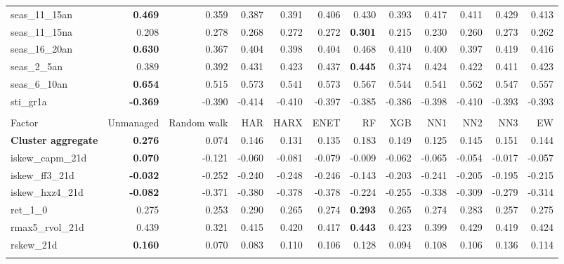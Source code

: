 \begin{landscape}
\begin{longtable}{>{\raggedright\arraybackslash}p{2.6cm}rrrrrrrrrrr}
seas\_11\_15an & \textbf{0.469} & 0.359 & 0.387 & 0.391 & 0.406 & 0.430 & 0.393 & 0.417 & 0.411 & 0.429 & 0.413 \\
seas\_11\_15na & 0.208 & 0.278 & 0.268 & 0.272 & 0.272 & \textbf{\cellcolor{blue!10}0.301} & 0.215 & 0.230 & 0.260 & 0.273 & 0.262 \\
seas\_16\_20an & \textbf{0.630} & 0.367 & 0.404 & 0.398 & 0.404 & 0.468 & 0.410 & 0.400 & 0.397 & 0.419 & 0.416 \\
seas\_2\_5an & 0.389 & 0.392 & \cellcolor{blue!10}0.431 & \cellcolor{blue!10}0.423 & \cellcolor{blue!10}0.437 & \textbf{\cellcolor{blue!10}0.445} & 0.374 & \cellcolor{blue!10}0.424 & \cellcolor{blue!10}0.422 & \cellcolor{blue!10}0.411 & \cellcolor{blue!10}0.423 \\
seas\_6\_10an & \textbf{0.654} & 0.515 & 0.573 & 0.541 & 0.573 & 0.567 & 0.544 & 0.541 & 0.562 & 0.547 & 0.557 \\
sti\_gr1a & \textbf{-0.369} & -0.390 & -0.414 & -0.410 & -0.397 & -0.385 & -0.386 & -0.398 & -0.410 & -0.393 & -0.393 \\
\hline
\multicolumn{12}{@{}l}{\textit{Panel K. Short-Term Reversal}} \\
\hline
Factor & Unmanaged & Random walk & HAR & HARX & ENET & RF & XGB & NN1 & NN2 & NN3 & EW \\
\hline
\textbf{Cluster aggregate} & \textbf{0.276} & 0.074 & 0.146 & 0.131 & 0.135 & 0.183 & 0.149 & 0.125 & 0.145 & 0.151 & 0.144 \\
iskew\_capm\_21d & \textbf{0.070} & -0.121 & -0.060 & -0.081 & -0.079 & -0.009 & -0.062 & -0.065 & -0.054 & -0.017 & -0.057 \\
iskew\_ff3\_21d & \textbf{-0.032} & -0.252 & -0.240 & -0.248 & -0.246 & -0.143 & -0.203 & -0.241 & -0.205 & -0.195 & -0.215 \\
iskew\_hxz4\_21d & \textbf{-0.082} & -0.371 & -0.380 & -0.378 & -0.378 & -0.224 & -0.255 & -0.338 & -0.309 & -0.279 & -0.314 \\
ret\_1\_0 & 0.275 & 0.253 & \cellcolor{blue!10}0.290 & 0.265 & 0.274 & \textbf{\cellcolor{blue!10}0.293} & 0.265 & 0.274 & \cellcolor{blue!10}0.283 & 0.257 & 0.275 \\
rmax5\_rvol\_21d & 0.439 & 0.321 & 0.415 & 0.420 & 0.417 & \textbf{\cellcolor{blue!10}0.443} & 0.423 & 0.399 & 0.429 & 0.419 & 0.424 \\
rskew\_21d & \textbf{0.160} & 0.070 & 0.083 & 0.110 & 0.106 & 0.128 & 0.094 & 0.108 & 0.106 & 0.136 & 0.114 \\
\hline
\multicolumn{12}{@{}l}{\textit{Panel L. Size}} \\

\end{longtable}
\end{landscape}
